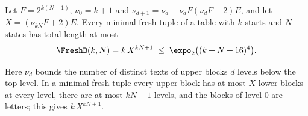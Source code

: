 \begin{theorem}\label{thm:fresh-bound}
Let $F=2^{k(N-1)}$, $\nu_0=k+1$ and $\nu_{d+1}=\nu_d+\nu_dF(\nu_dF+2)E$,
and let $X=(\nu_{kN}F+2)E$. Every minimal fresh tuple of a table with $k$
starts and $N$ states has total length at most
\[
  \FreshB(k,N)=k\,X^{kN+1}\;\le\;\expo_2\bigl((k+N+16)^4\bigr).
\]
\end{theorem}

Here $\nu_d$ bounds the number of distinct texts of upper blocks $d$
levels below the top level. In a minimal fresh tuple every upper block has
at most $X$ lower blocks at every level, there are at most $kN+1$ levels,
and the blocks of level $0$ are letters; this gives $k\,X^{kN+1}$.
